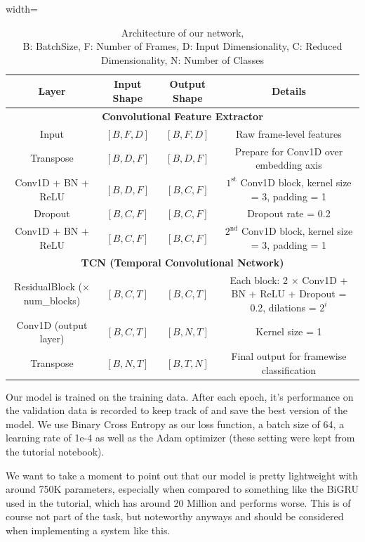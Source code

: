 \begin{table}[h]
\centering
\begin{adjustbox}{width=\textwidth}
\begin{tabular}{|c|c|c|c|}
\hline
\textbf{Layer} & \textbf{Input Shape} & \textbf{Output Shape} & \textbf{Details} \\
\hline
\multicolumn{4}{|c|}{\textbf{Convolutional Feature Extractor}} \\
\hline
Input & $[B, F, D]$ & $[B, F, D]$ & Raw frame-level features \\
\hline
Transpose & $[B, D, F]$ & $[B, D, F]$ & Prepare for Conv1D over embedding axis \\
\hline
Conv1D + BN + ReLU & $[B, D, F]$ & $[B, C, F]$ & $1^{\text{st}}$ Conv1D block, kernel size = 3, padding = 1 \\
\hline
Dropout & $[B, C, F]$ & $[B, C, F]$ & Dropout rate = 0.2 \\
\hline
Conv1D + BN + ReLU & $[B, C, F]$ & $[B, C, F]$ & $2^{\text{nd}}$ Conv1D block, kernel size = 3, padding = 1 \\
\hline
\multicolumn{4}{|c|}{\textbf{TCN (Temporal Convolutional Network)}} \\
\hline
ResidualBlock (× num\_blocks) & $[B, C, T]$ & $[B, C, T]$ & Each block: 2 × Conv1D + BN + ReLU + Dropout = 0.2, dilations = $2^i$ \\
\hline
Conv1D (output layer) & $[B, C, T]$ & $[B, N, T]$ & Kernel size = 1 \\
\hline
Transpose & $[B, N, T]$ & $[B, T, N]$ & Final output for framewise classification \\
\hline
\end{tabular}
\end{adjustbox}
\captionsetup{justification=centering}
\caption{Architecture of our network, \\ B: BatchSize, F: Number of Frames, D: Input Dimensionality, C: Reduced Dimensionality, N: Number of Classes}
\label{tab:architecture}
\end{table}

Our model is trained on the training data. After each epoch, it's performance on the validation data is recorded to keep track of and save the best version of the model. We use Binary Cross Entropy as our loss function, a batch size of 64, a learning rate of 1e-4 as well as the Adam optimizer (these setting were kept from the tutorial notebook).

We want to take a moment to point out that our model is pretty lightweight with around 750K parameters, especially when compared to something like the BiGRU used in the tutorial, which has around 20 Million and performs worse. This is of course not part of the task, but noteworthy anyways and should be considered when implementing a system like this.


